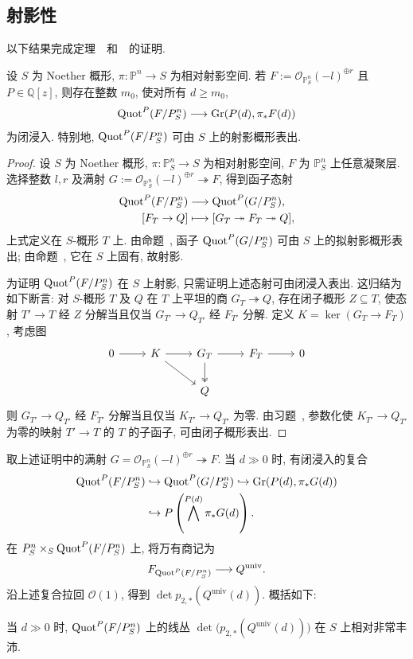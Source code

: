 \subsection{射影性}\label{src:2.4.3-subsection}
以下结果完成定理~~和~~的证明.
\begin{theorem}\label{src:2.4.5}
设 $S$ 为 Noether 概形, $\pi:\mathbb P^n\to S$ 为相对射影空间.
若 $F:=\mathcal O_{\mathbb P_S^n}(-l)^{\oplus r}$ 且 $P\in\mathbb Q[z]$, 则存在整数 $m_0$, 使对所有 $d\geq m_0$, 
\[
\operatorname{Quot}^P(F/P_S^n)\longrightarrow\operatorname{Gr}(P(d),\pi_*F(d))
\]
为闭浸入. 特别地, $\operatorname{Quot}^P(F/P_S^n)$ 可由 $S$ 上的射影概形表出.
\end{theorem}
\begin{proof}
设 $S$ 为 Noether 概形, $\pi:\mathbb P_S^n\to S$ 为相对射影空间, $F$ 为 $\mathbb P_S^n$ 上任意凝聚层.
选择整数 $l,r$ 及满射 $G:=\mathcal O_{\mathbb P_S^n}(-l)^{\oplus r}\twoheadrightarrow F$, 得到函子态射
\[
\begin{aligned}
\operatorname{Quot}^P(F/P_S^n)&\longrightarrow\operatorname{Quot}^P(G/P_S^n),\\
[F_T\to Q]&\longmapsto[G_T\twoheadrightarrow F_T\twoheadrightarrow Q],
\end{aligned}
\]
上式定义在 $S$-概形 $T$ 上.
由命题~, 函子 $\operatorname{Quot}^P(G/P_S^n)$ 可由 $S$ 上的拟射影概形表出; 由命题~, 它在 $S$ 上固有, 故射影.

为证明 $\operatorname{Quot}^P(F/P_S^n)$ 在 $S$ 上射影, 只需证明上述态射可由闭浸入表出.
这归结为如下断言: 对 $S$-概形 $T$ 及 $Q$ 在 $T$ 上平坦的商 $G_T\twoheadrightarrow Q$, 存在闭子概形 $Z\subseteq T$, 使态射 $T'\to T$ 经 $Z$ 分解当且仅当 $G_{T'}\to Q_{T'}$ 经 $F_{T'}$ 分解.
定义 $K=\ker(G_T\to F_T)$, 考虑图
\[
\begin{tikzcd}
0\arrow[r]&K\arrow[r]\arrow[dr]&G_T\arrow[r]\arrow[d,two heads]&F_T\arrow[r]&0\\
&&Q&&
\end{tikzcd}
\]
则 $G_{T'}\to Q_{T'}$ 经 $F_{T'}$ 分解当且仅当 $K_{T'}\to Q_{T'}$ 为零.
由习题~, 参数化使 $K_{T'}\to Q_{T'}$ 为零的映射 $T'\to T$ 的 $T$ 的子函子, 可由闭子概形表出.
\end{proof}
取上述证明中的满射 $G=\mathcal O_{\mathbb P_S^n}(-l)^{\oplus r}\twoheadrightarrow F$.
当 $d\gg0$ 时, 有闭浸入的复合
\[
\begin{aligned}
\operatorname{Quot}^P(F/P_S^n)&\hookrightarrow\operatorname{Quot}^P(G/P_S^n)
\hookrightarrow\operatorname{Gr}(P(d),\pi_*G(d))\\
&\hookrightarrow P\left(\bigwedge^{P(d)}\pi_*G(d)\right).
\end{aligned}
\]
在 $P_S^n\times_S\operatorname{Quot}^P(F/P_S^n)$ 上, 将万有商记为
\[
F_{\operatorname{Quot}^P(F/P_S^n)}\longrightarrow Q^{\mathrm{univ}}.
\]
沿上述复合拉回 $\mathcal O(1)$, 得到 $\det p_{2,*}(Q^{\mathrm{univ}}(d))$.
概括如下: 
\begin{corollary}\label{src:2.4.6}
当 $d\gg0$ 时, $\operatorname{Quot}^P(F/P_S^n)$ 上的线丛
$\det\bigl(p_{2,*}(Q^{\mathrm{univ}}(d))\bigr)$ 在 $S$ 上相对非常丰沛.
\end{corollary}
